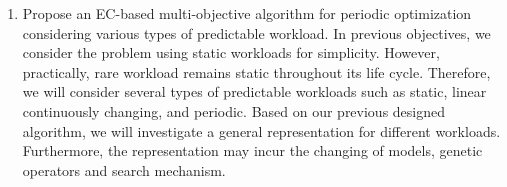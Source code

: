 \begin{enumerate}
	\item Propose an EC-based multi-objective algorithm for periodic optimization considering various types of predictable workload.
	 In previous objectives, we consider the problem using static workloads for simplicity. However, practically, rare workload remains static throughout its life cycle. Therefore, we will consider several types of predictable workloads \cite{Fehling:2014tl} such as static, linear continuously changing, and periodic. Based on our previous designed algorithm, we will investigate a general representation for different workloads. Furthermore, the representation may incur the changing of models, genetic operators and search mechanism.





	

	

	\end{enumerate}

